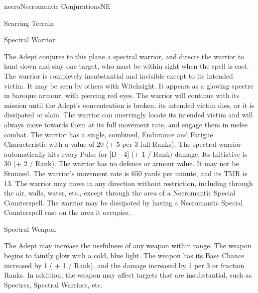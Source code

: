 \begin{college}[1.1]{necro}{Necromantic Conjurations}{NE}
\begin{spell}[S-11]{Scarring Terrain}
\begin{effects}
\end{effects}
\end{spell}

\begin{spell}[S-12]{Spectral Warrior}

\begin{effects}
The Adept conjures to this plane a spectral warrior, and directs the
warrior to hunt down and slay one target, who must be within sight
when the spell is cast.  The warrior is completely insubstantial and
invisible except to its intended victim.  It may be seen by others
with Witchsight.  It appears as a glowing spectre in baroque armour,
with piercing red eyes.  The warrior will continue with its mission
until the Adept's concentration is broken, its intended victim dies,
or it is dissipated or slain.  The warrior can unerringly locate its
intended victim and will always move towards them at its full movement
rate, and engage them in melee combat.  The warrior has a single,
combined, Endurance and Fatigue Characteristic with a value of 20 (+ 5
per 3 full Ranks).  The spectral warrior automatically hits every
Pulse for [D - 4] (+ 1 / Rank) damage.  Its Initiative is 30 (+ 2 /
Rank). The warrior has no defence or armour value.  It may not be
Stunned. The warrior's movement rate is 650 yards per minute, and its
TMR is 13.  The warrior may move in any direction without restriction,
including through the air, walls, water, etc., except through the area
of a Necromantic Special Counterspell.  The warrior may be dissipated
by having a Necromantic Special Counterspell cast on the area it
occupies.
\end{effects}
\end{spell}

\begin{spell}[S-13]{Spectral Weapon}

\begin{effects}
The Adept may increase the usefulness of any weapon within range.  The
weapon begins to faintly glow with a cold, blue light.  The weapon has
its Base Chance increased by 1 ( + 1 / Rank), and the damage increased
by 1 per 3 or fraction Ranks.  In addition, the weapon may affect
targets that are insubstantial, such as Spectres, Spectral Warriors,
etc.
\end{effects}
\end{spell}


\end{college}
